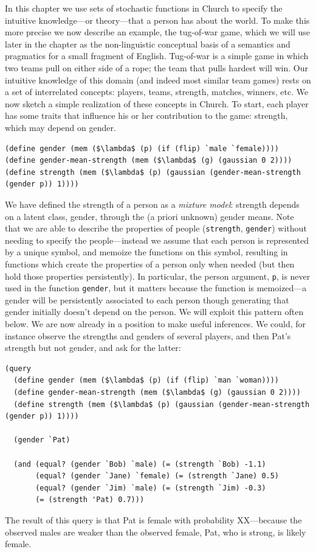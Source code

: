 \documentclass[12pt]{article}
\begin{document}
In this chapter we use sets of stochastic functions in Church to specify the intuitive knowledge---or theory---that a person has about the world. 
To make this more precise we now describe an example, the tug-of-war game, which we will use later in the chapter as the non-linguistic conceptual basis of a semantics and pragmatics for a small fragment of English. 
Tug-of-war is a simple game in which two teams pull on either side of a rope; the team that pulls hardest will win. 
Our intuitive knowledge of this domain (and indeed most similar team games) rests on a set of interrelated concepts: players, teams, strength, matches, winners, etc. 
We now sketch a simple realization of these concepts in Church. 
To start, each player has some traits that influence his or her contribution to the game: strength, which may depend on gender.
\begin{lstlisting}[mathescape]
(define gender (mem ($\lambda$ (p) (if (flip) `male `female))))
(define gender-mean-strength (mem ($\lambda$ (g) (gaussian 0 2))))
(define strength (mem ($\lambda$ (p) (gaussian (gender-mean-strength (gender p)) 1))))
\end{lstlisting}
We have defined the strength of a person as a \emph{mixture model}: strength depends on a latent class, gender, through the (a priori unknown) gender means. 
Note that we are able to describe the properties of people (\lstinline{strength}, \lstinline{gender}) without needing to specify the people---instead we assume that each person is represented by a unique symbol, and memoize the functions on this symbol, resulting in functions which create the properties of a person only when needed (but then hold those properties persistently). 
In particular, the person argument, \lstinline{p}, is never used in the function \lstinline{gender}, but it matters because the function is memoized---a gender will be persistently associated to each person though generating that gender initially doesn't depend on the person. 
We will exploit this pattern often below.
We are now already in a position to make useful inferences. 
We could, for instance observe the strengths and genders of several players, and then Pat's strength but not gender, and ask for the latter:
\begin{lstlisting}[mathescape]
(query
  (define gender (mem ($\lambda$ (p) (if (flip) `man `woman))))
  (define gender-mean-strength (mem ($\lambda$ (g) (gaussian 0 2))))
  (define strength (mem ($\lambda$ (p) (gaussian (gender-mean-strength (gender p)) 1))))
  
  (gender `Pat)
  
  (and (equal? (gender `Bob) `male) (= (strength `Bob) -1.1)
       (equal? (gender `Jane) `female) (= (strength `Jane) 0.5)
       (equal? (gender `Jim) `male) (= (strength `Jim) -0.3)
       (= (strength 'Pat) 0.7)))
\end{lstlisting}
The result of this query is that Pat is female with probability XX---because the observed males are weaker than the observed female, Pat, who is strong, is likely female.
\end{document}
